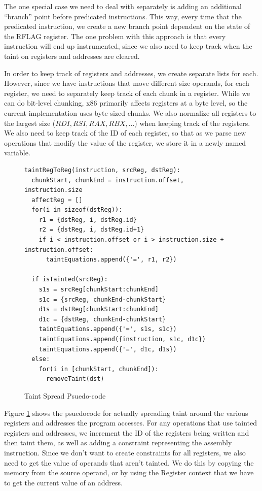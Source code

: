 The one special case we need to deal with separately is adding an additional
``branch'' point before predicated instructions. This way, every time that the
predicated instruction, we create a new branch point dependent on the state of
the RFLAG register. The one problem with this approach is that every instruction
will end up instrumented, since we also need to keep track when the taint on
registers and addresses are cleared.

In order to keep track of registers and addresses, we create separate lists for
each. However, since we have instructions that move different size operands, for
each register, we need to separately keep track of each chunk in a
register. While we can do bit-level chunking, x86 primarily affects registers at
a byte level, so the current implementation uses byte-sized chunks. We also
normalize all registers to the largest size ($RDI, RSI, RAX, RBX, \ldots$) when
keeping track of the registers. We also need to keep track of the ID of each
register, so that as we parse new operations that modify the value of the
register, we store it in a newly named variable.

\begin{figure}[ht]
 \centering
\begin{verbatim}
taintRegToReg(instruction, srcReg, dstReg):
  chunkStart, chunkEnd = instruction.offset, instruction.size
  affectReg = []
  for(i in sizeof(dstReg)):
    r1 = {dstReg, i, dstReg.id}
    r2 = {dstReg, i, dstReg.id+1}
    if i < instruction.offset or i > instruction.size + instruction.offset:
      taintEquations.append({'=', r1, r2})

  if isTainted(srcReg):
    s1s = srcReg[chunkStart:chunkEnd]
    s1c = {srcReg, chunkEnd-chunkStart}
    d1s = dstReg[chunkStart:chunkEnd]
    d1c = {dstReg, chunkEnd-chunkStart}
    taintEquations.append({'=', s1s, s1c})
    taintEquations.append({instruction, s1c, d1c})
    taintEquations.append({'=', d1c, d1s})
  else:
    for(i in [chunkStart, chunkEnd]):
      removeTaint(dst)
\end{verbatim}
 \caption{Taint Spread Psuedo-code}
 \label{figure:taintcode}
\end{figure}


Figure \ref{figure:taintcode} shows the psuedocode for actually spreading taint
around the various registers and addresses the program accesses. For any
operations that use tainted registers and addresses, we increment the ID of the
registers being written and then taint them, as well as adding a constraint
representing the assembly instruction. Since we don't want to create constraints
for all registers, we also need to get the value of operands that aren't
tainted. We do this by copying the memory from the source operand, or by using
the Register context that we have to get the current value of an address.

